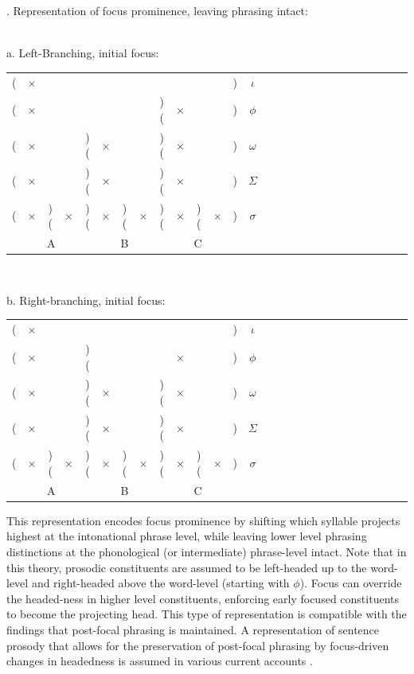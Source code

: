 \documentclass[preprint,review,12pt,authoryear,times]{elsarticle}
\newcommand{\g}{$\times$}
\begin{document}
\ex. Representation of focus prominence, leaving phrasing intact:\\\label{focusrep}
\vspace{-10pt}
\ \\
\parbox{2in}{\footnotesize a. Left-Branching, initial focus:\\
\vspace{-12pt}
\setlength{\unitlength}{1cm}
\setlength\extrarowheight{-3pt}
\begin{tabular}{ccccccccccccccccccccccccccc}
 (&\g&&&&&&&&&&&)&\em $\iota$\\
(&\g&&&&&&&)(&\g&&&)&$\phi$\\
(&\g&&&)(&\g&&&)(&\g&&&)&$\omega$\\
(&\g&&&)(&\g&&&)(&\g&&&)&$\Sigma$\\
(&\g&)(&\g&)(&\g&)(&\g&)(&\g&)(&\g&)&$\sigma$\\
\multicolumn{5}{c}{A}&\multicolumn{3}{c}{B}&\multicolumn{5}{c}{C}\\
\end{tabular}
 }
 \vspace{10pt}
  \ \\
\parbox{2in}{\footnotesize b. Right-branching, initial focus:\\
\vspace{-12pt}
\setlength{\unitlength}{1cm}
\setlength\extrarowheight{-3pt}
\begin{tabular}{ccccccccccccccccccccccccccc}
(&\g&&&&&&&&&&&)&\em $\iota$\\
(&\g&&&)(&&&&&\g&&&)&$\phi$\\
(&\g&&&)(&\g&&&)(&\g&&&)&$\omega$\\
(&\g&&&)(&\g&&&)(&\g&&&)&$\Sigma$\\
(&\g&)(&\g&)(&\g&)(&\g&)(&\g&)(&\g&)&$\sigma$\\
\multicolumn{5}{c}{A}&\multicolumn{3}{c}{B}&\multicolumn{5}{c}{C}\\
\end{tabular}
}\label{feryfocus}


This representation encodes focus prominence by shifting which syllable projects highest at the intonational phrase level, while leaving lower level phrasing distinctions at the phonological (or intermediate) phrase-level intact. Note that in this theory, prosodic constituents are assumed to be left-headed up to the word-level and right-headed above the word-level (starting with $\phi$). Focus can override the headed-ness in higher level constituents, enforcing early focused constituents to become the projecting head. This type of representation is compatible with the findings that post-focal phrasing is maintained. A representation of sentence prosody that allows for the preservation of post-focal phrasing by focus-driven changes in headedness is assumed in various current accounts \citep[][i.a.]{truck95,burin10,fery12a,fery13,kugle17}.
\end{document}
